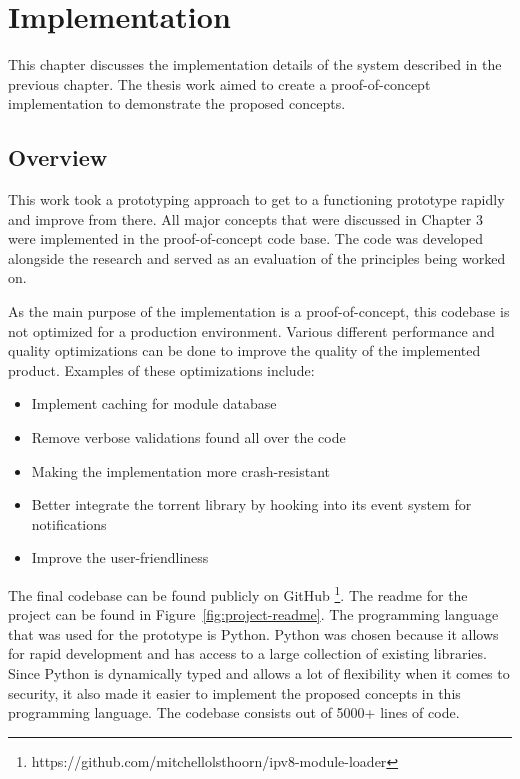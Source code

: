 \chapter{\label{chap:implementation}Implementation}

This chapter discusses the implementation details of the system described in the previous chapter. The thesis work aimed to create a proof-of-concept implementation to demonstrate the proposed concepts. 


\section{Overview}


This work took a prototyping approach to get to a functioning prototype rapidly and improve from there. All major concepts that were discussed in Chapter 3 were implemented in the proof-of-concept code base. The code was developed alongside the research and served as an evaluation of the principles being worked on. 

As the main purpose of the implementation is a proof-of-concept, this codebase is not optimized for a production environment. Various different performance and quality optimizations can be done to improve the quality of the implemented product. Examples of these optimizations include:

\begin{itemize}
	\item Implement caching for module database
	\item Remove verbose validations found all over the code
	\item Making the implementation more crash-resistant
	\item Better integrate the torrent library by hooking into its event system for notifications 
	\item Improve the user-friendliness
\end{itemize}

The final codebase can be found publicly on GitHub \footnote{https://github.com/mitchellolsthoorn/ipv8-module-loader}. The readme for the project can be found in Figure~\ref{fig:project-readme}. The programming language that was used for the prototype is Python. Python was chosen because it allows for rapid development and has access to a large collection of existing libraries. Since Python is dynamically typed and allows a lot of flexibility when it comes to security, it also made it easier to implement the proposed concepts in this programming language. The codebase consists out of 5000+ lines of code.

